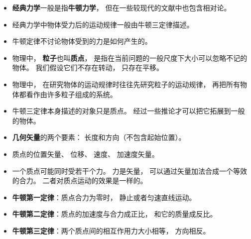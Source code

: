 
\begin{issues}
\issueDraft
\end{issues}

\begin{itemize}
\item \textbf{经典力学}一般是指\textbf{牛顿力学}， 但在一些较现代的文献中也包含相对论。
\item 经典力学中物体受力后的运动规律一般由牛顿三定律描述。
\item 牛顿定律不讨论物体受到的力是如何产生的。
\item 物理中， \textbf{粒子}也叫\textbf{质点}， 是指在当前问题的一般尺度下大小可以忽略不记的物体。 我们假设它们不存在转动， 只存在平移。
\item 物理中， 在研究物体的运动规律时往往先研究粒子的运动规律， 再把所有物体都看作由许多粒子组成的系统。
\item 牛顿三定律本身描述的对象只是质点。 经过一些推论才可以把它拓展到一般的物体。
\item \textbf{几何矢量}的两个要素： 长度和方向（不包含起始位置）。
\item 质点的位置矢量、 位移、 速度、 加速度矢量。
\item 一个质点可能同时受若干个力。 力是矢量， 可以通过矢量加法合成一个等效的合力。 二者对质点运动的效果是一样的。
\item \textbf{牛顿第一定律}：质点合力为零时， 静止或者匀速直线运动。
\item \textbf{牛顿第二定律}：质点的加速度与合力成正比， 和它的质量成反比。
\item \textbf{牛顿第三定律}：两个质点间的相互作用力大小相等， 方向相反。
\end{itemize}
